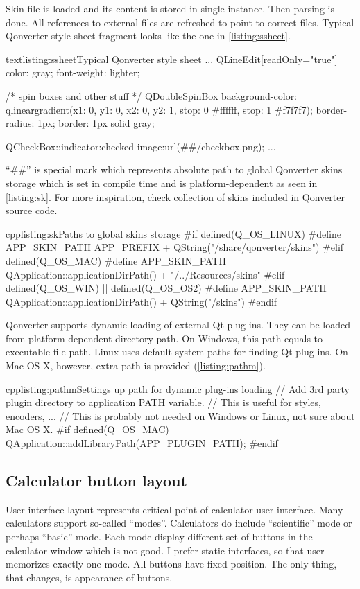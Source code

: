 Skin file is loaded and its content is stored in single instance. Then parsing is done. All references to external files are refreshed to point to correct files. Typical Qonverter style sheet fragment looks like the one in \autoref{listing:ssheet}.

\begin{fdoccode}{text}{listing:ssheet}{Typical Qonverter style sheet}
...
QLineEdit[readOnly="true"] {
    color: gray;
    font-weight: lighter;
}

/* spin boxes and other stuff */
QDoubleSpinBox {
    background-color: qlineargradient(x1: 0, y1: 0, x2: 0, y2: 1, stop: 0 #ffffff, stop: 1 #f7f7f7);
    border-radius: 1px;
	border: 1px solid gray;
}

QCheckBox::indicator:checked {
    image:url(##/checkbox.png);
}
...
\end{fdoccode}

\enquote{\#\#} is special mark which represents absolute path to global Qonverter skins storage which is set in compile time and is platform-dependent as seen in \autoref{listing:sk}. For more inspiration, check collection of skins included in Qonverter source code.

\begin{fdoccode}{cpp}{listing:sk}{Paths to global skins storage}
#if defined(Q_OS_LINUX)
#define	APP_SKIN_PATH APP_PREFIX + QString("/share/qonverter/skins")
#elif defined(Q_OS_MAC)
#define	APP_SKIN_PATH QApplication::applicationDirPath() + "/../Resources/skins"
#elif defined(Q_OS_WIN) || defined(Q_OS_OS2)
#define	APP_SKIN_PATH QApplication::applicationDirPath() + QString("/skins")
#endif
\end{fdoccode}

Qonverter supports dynamic loading of external Qt plug-ins. They can be loaded from platform-dependent directory path. On Windows, this path equals to executable file path. Linux uses default system paths for finding Qt plug-ins. On Mac OS X, however, extra path is provided (\autoref{listing:pathm}).
\begin{fdoccode}{cpp}{listing:pathm}{Settings up path for dynamic plug-ins loading}
  // Add 3rd party plugin directory to application PATH variable.
  // This is useful for styles, encoders, ...
  // This is probably not needed on Windows or Linux, not sure about Mac OS X.
#if defined(Q_OS_MAC)
  QApplication::addLibraryPath(APP_PLUGIN_PATH);
#endif
\end{fdoccode}

\subsection{Calculator button layout}
User interface layout represents critical point of calculator user interface. Many calculators support so-called \enquote{modes}. Calculators do include \enquote{scientific} mode or perhaps \enquote{basic} mode. Each mode display different set of buttons in the calculator window which is not good. I prefer static interfaces, so that user memorizes exactly one mode. All buttons have fixed position. The only thing, that changes, is appearance of buttons.

